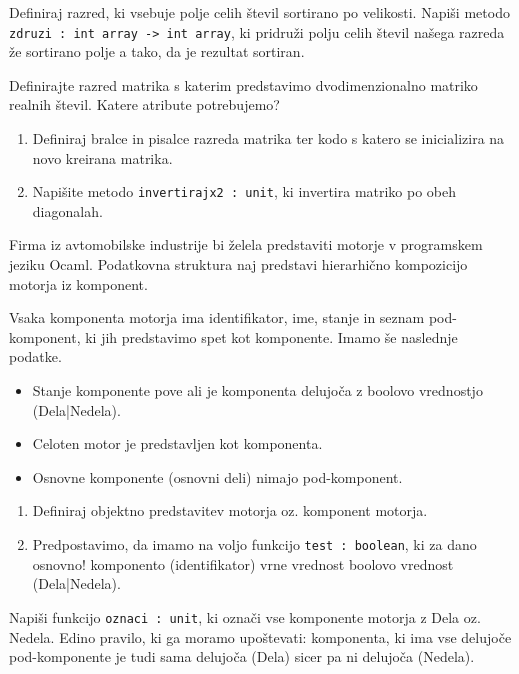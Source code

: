 \begin{ex}
Definiraj razred, ki vsebuje polje celih \v stevil sortirano po velikosti. Napi\v si metodo \lstinline{zdruzi : int array -> int array}, ki pridru\v zi polju celih \v stevil na\v sega razreda \v ze sortirano polje a tako, da je rezultat sortiran.
\end{ex}




\begin{ex}
Definirajte razred matrika s katerim predstavimo dvodimenzionalno matriko realnih \v stevil. Katere atribute potrebujemo?
\begin{enumerate}
\item Definiraj bralce in pisalce razreda matrika ter kodo s katero se inicializira na novo kreirana matrika.
\item Napi\v site metodo \lstinline{invertirajx2 : unit}, ki invertira matriko po obeh diagonalah.
\end{enumerate}
\end{ex}





\begin{ex}
Firma iz avtomobilske industrije bi \v zelela predstaviti motorje v programskem jeziku Ocaml. Podatkovna struktura naj predstavi hierarhi\v cno kompozicijo motorja iz komponent. 

Vsaka komponenta motorja ima identifikator, ime, stanje in seznam pod-komponent, ki jih predstavimo spet kot komponente. Imamo \v se naslednje podatke.
\begin{itemize}
\item Stanje komponente pove ali je komponenta delujo\v ca z boolovo vrednostjo (Dela|Nedela). 
\item Celoten motor je predstavljen kot komponenta. 
\item Osnovne komponente (osnovni deli) nimajo pod-komponent.
\end{itemize}
\begin{enumerate}
\item Definiraj objektno predstavitev motorja oz. komponent motorja.
\item Predpostavimo, da imamo na voljo funkcijo \lstinline{test : boolean}, ki za dano osnovno! komponento (identifikator) vrne vrednost boolovo vrednost (Dela|Nedela). 
\end{enumerate}
Napi\v si funkcijo \lstinline{oznaci : unit}, ki ozna\v ci vse komponente motorja z Dela oz. Nedela. Edino pravilo, ki ga moramo upo\v stevati: komponenta, ki ima vse delujo\v ce pod-komponente je tudi sama delujo\v ca (Dela) sicer pa ni delujo\v ca (Nedela). 
\end{ex}








